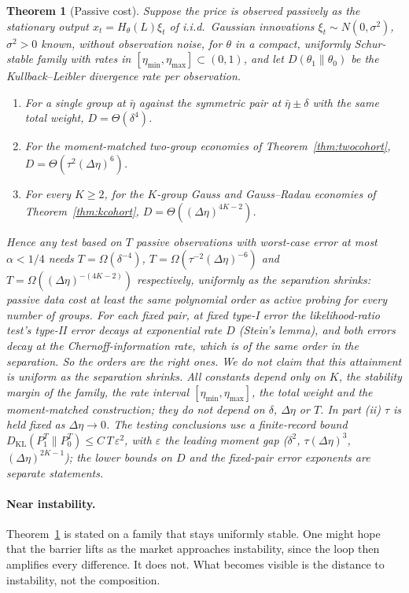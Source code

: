 \documentclass[12pt]{article}
\newtheorem{theorem}{Theorem}[section]
\theoremstyle{definition}
\theoremstyle{remark}
\newcommand{\KL}{D_{\mathrm{KL}}}
\begin{document}
\begin{theorem}[Passive cost]\label{prop:passive}
Suppose the price is observed passively as the stationary output $x_t=H_\theta(L)\xi_t$ of i.i.d.\ Gaussian innovations $\xi_t\sim N(0,\sigma^2)$, $\sigma^2>0$ known, without observation noise, for $\theta$ in a compact, uniformly Schur-stable family with rates in $[\eta_{\min},\eta_{\max}]\subset(0,1)$, and let $D(\theta_1\|\theta_0)$ be the Kullback--Leibler divergence rate per observation.
\begin{enumerate}[label=(\roman*)]
\item For a single group at $\bar\eta$ against the symmetric pair at $\bar\eta\pm\delta$ with the same total weight, $D=\Theta(\delta^4)$.
\item For the moment-matched two-group economies of Theorem~\ref{thm:twocohort}, $D=\Theta(\tau^2(\Delta\eta)^6)$.
\item For every $K\ge2$, for the $K$-group Gauss and Gauss--Radau economies of Theorem~\ref{thm:kcohort}, $D=\Theta((\Delta\eta)^{4K-2})$.
\end{enumerate}
Hence any test based on $T$ passive observations with worst-case error at most $\alpha<1/4$ needs $T=\Omega(\delta^{-4})$, $T=\Omega(\tau^{-2}(\Delta\eta)^{-6})$ and $T=\Omega((\Delta\eta)^{-(4K-2)})$ respectively, uniformly as the separation shrinks: passive data cost at least the same polynomial order as active probing for every number of groups. For each fixed pair, at fixed type-I error the likelihood-ratio test's type-II error decays at exponential rate $D$ (Stein's lemma), and both errors decay at the Chernoff-information rate, which is of the same order in the separation. So the orders are the right ones. We do not claim that this attainment is uniform as the separation shrinks. All constants depend only on $K$, the stability margin of the family, the rate interval $[\eta_{\min},\eta_{\max}]$, the total weight and the moment-matched construction; they do not depend on $\delta$, $\Delta\eta$ or $T$. In part (ii) $\tau$ is held fixed as $\Delta\eta\to0$. The testing conclusions use a finite-record bound $\KL(P_1^T\|P_0^T)\le C\,T\,\varepsilon^2$, with $\varepsilon$ the leading moment gap ($\delta^2$, $\tau(\Delta\eta)^3$, $(\Delta\eta)^{2K-1}$); the lower bounds on $D$ and the fixed-pair error exponents are separate statements.
\end{theorem}



\paragraph{Near instability.} Theorem~\ref{prop:passive} is stated on a family that stays uniformly stable. One might hope that the barrier lifts as the market approaches instability, since the loop then amplifies every difference. It does not. What becomes visible is the distance to instability, not the composition.
\end{document}
